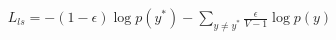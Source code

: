 \documentclass[preview]{standalone}
\begin{document}
\begin{align*}
L_{ls} = -(1-\epsilon)\log p(y^*) - \sum_{y\ne y^*} \frac{\epsilon}{V-1} \log p(y)
\end{align*}
\end{document}
